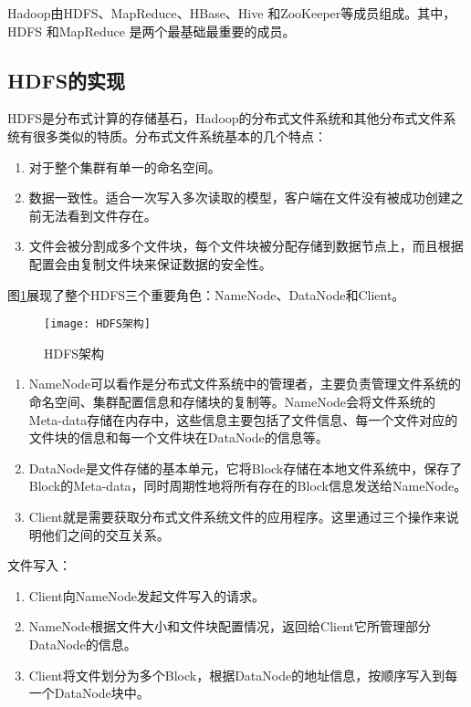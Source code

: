 Hadoop由HDFS、MapReduce、HBase、Hive 和ZooKeeper等成员组成。其中，HDFS 和MapReduce 是两个最基础最重要的成员。

\subsection[HDFS的实现]{HDFS的实现\cite{site:hdfs}}
HDFS是分布式计算的存储基石，Hadoop的分布式文件系统和其他分布式文件系统有很多类似的特质。分布式文件系统基本的几个特点：

\begin{enumerate}
\item 对于整个集群有单一的命名空间。
\item 数据一致性。适合一次写入多次读取的模型，客户端在文件没有被成功创建之前无法看到文件存在。
\item 文件会被分割成多个文件块，每个文件块被分配存储到数据节点上，而且根据配置会由复制文件块来保证数据的安全性。
\end{enumerate}

图\ref{fig:HDFS架构}展现了整个HDFS三个重要角色：NameNode、DataNode和Client。

\begin{figure}[h]
 \centering
 \texttt{[image: HDFS架构]}
 \caption{HDFS架构}
 \label{fig:HDFS架构}
\end{figure}

\begin{enumerate}
\item NameNode可以看作是分布式文件系统中的管理者，主要负责管理文件系统的命名空间、集群配置信息和存储块的复制等。NameNode会将文件系统的Meta-data存储在内存中，这些信息主要包括了文件信息、每一个文件对应的文件块的信息和每一个文件块在DataNode的信息等。
\item DataNode是文件存储的基本单元，它将Block存储在本地文件系统中，保存了Block的Meta-data，同时周期性地将所有存在的Block信息发送给NameNode。
\item Client就是需要获取分布式文件系统文件的应用程序。这里通过三个操作来说明他们之间的交互关系。
\end{enumerate}

文件写入：

\begin{enumerate}
\item Client向NameNode发起文件写入的请求。
\item NameNode根据文件大小和文件块配置情况，返回给Client它所管理部分DataNode的信息。
\item Client将文件划分为多个Block，根据DataNode的地址信息，按顺序写入到每一个DataNode块中。
\end{enumerate}

